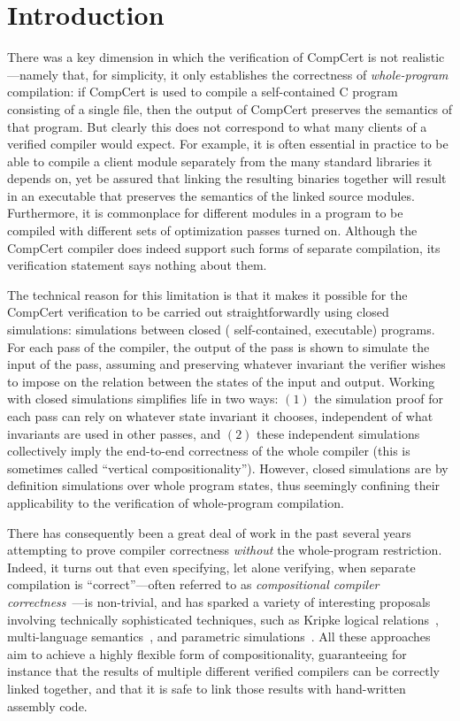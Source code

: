 \section{Introduction}
\label{sec:sepcomp:introduction}

There was a key dimension in which the verification of CompCert is not realistic---namely that, for
simplicity, it only establishes the correctness of \emph{whole-program} compilation: if CompCert is
used to compile a self-contained C program consisting of a single file, then the output of CompCert
preserves the semantics of that program.  But clearly this does not correspond to what many clients
of a verified compiler would expect.  For example, it is often essential in practice to be able to
compile a client module separately from the many standard libraries it depends on, yet be assured
that linking the resulting binaries together will result in an executable that preserves the
semantics of the linked source modules.  Furthermore, it is commonplace for different modules in a
program to be compiled with different sets of optimization passes turned on.  Although the CompCert
compiler does indeed support such forms of separate compilation, its verification statement says
nothing about them.

The technical reason for this limitation is that it makes it possible for the CompCert verification
to be carried out straightforwardly using closed simulations: simulations between closed (\ie
self-contained, executable) programs.  For each pass of the compiler, the output of the pass is
shown to simulate the input of the pass, assuming and preserving whatever invariant the verifier
wishes to impose on the relation between the states of the input and output.  Working with closed
simulations simplifies life in two ways: $(1)$ the simulation proof for each pass can rely on
whatever state invariant it chooses, independent of what invariants are used in other passes, and
$(2)$ these independent simulations collectively imply the end-to-end correctness of the whole
compiler (this is sometimes called ``vertical compositionality'').  However, closed simulations are
by definition simulations over whole program states, thus seemingly confining their applicability to
the verification of whole-program compilation.

There has consequently been a great deal of work in the past several years attempting to prove
compiler correctness \emph{without} the whole-program restriction.  Indeed, it turns out that even
specifying, let alone verifying, when separate compilation is ``correct''---often referred to as
\emph{compositional compiler correctness}~\cite{benton+:icfp09}---is non-trivial, and has sparked a
variety of interesting proposals involving technically sophisticated techniques, such as Kripke
logical relations~\cite{hur+:popl11}, multi-language semantics~\cite{perconti+:esop14}, and
parametric simulations~\cite{hur+:popl12,neis+:icfp15}.  All these approaches aim to achieve a
highly flexible form of compositionality, guaranteeing for instance that the results of multiple
different verified compilers can be correctly linked together, and that it is safe to link those
results with hand-written assembly code.

